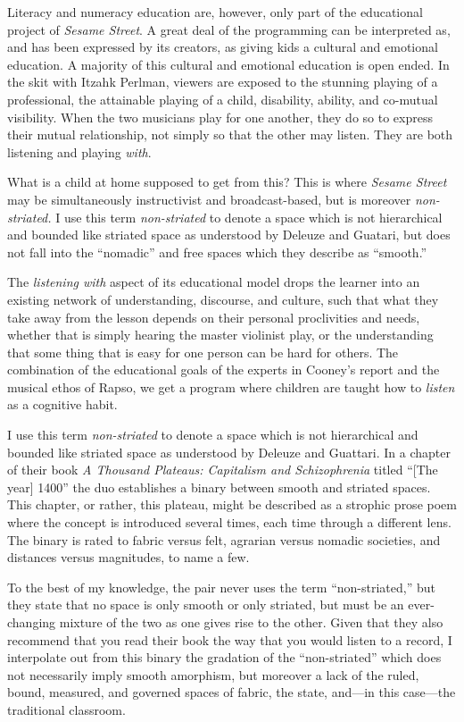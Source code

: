 \documentclass[12pt,letterpaper]{article}
\begin{document}
	Literacy and numeracy education are, however, only part of the 
	educational project of \textit{Sesame Street}. A great deal of the 
	programming can be interpreted as, and has been expressed by its 
	creators, as giving kids a cultural and emotional 
	education.\autocite[297]{Ostrofsky2012}
	A majority of this cultural and emotional education is open ended. 
	In the skit with Itzahk Perlman, viewers are exposed to the stunning 
	playing of a professional, the attainable playing of a child, 
	disability, ability, and co-mutual visibility. When the two musicians 
	play for one another, they do so to express their mutual relationship, 
	not simply so that the other may listen. They are both listening and 
	playing \textit{with}. 

	What is a child at home supposed to get from this? This is where 
	\textit{Sesame Street} may be simultaneously instructivist and 
	broadcast-based, but 
	is moreover \textit{non-striated.} I use this term 
	\textit{non-striated} to denote a space which is not
	hierarchical and bounded like striated space as understood by Deleuze 
	and Guatari, but does not fall into the ``nomadic'' and free spaces 
	which they describe as ``smooth.'' 

	The \textit{listening with} aspect of its 
	educational model drops the learner into an existing network of 
	understanding, discourse, and culture, such that what they take away
	from the lesson depends on their personal proclivities and needs, 
	whether that is simply hearing the master violinist play, or the 
	understanding that some thing that is easy for one person can be hard 
	for others. The combination of the educational goals of the experts
	in Cooney's report and the musical ethos of Rapso, we get a program 
	where children are taught how to \textit{listen} as a cognitive habit. 

	I use this term \textit{non-striated} to denote a space which is not
	hierarchical and bounded like striated space as understood by Deleuze 
	and Guattari. In a chapter of their book \textit{A Thousand Plateaus: 
	Capitalism and Schizophrenia} titled ``[The year] 1400'' the duo 
	establishes a binary between smooth and striated spaces. This chapter, 
	or rather, this
	plateau, might be described as a strophic prose poem where the concept 
	is introduced several times, each time through a different lens. The 
	binary 
	is rated to fabric versus felt,	agrarian versus nomadic societies, and 
	distances versus magnitudes, to name a few.   

	To the best of my knowledge, the pair never uses the term 
	``non-striated,'' but they state that no space is only smooth or 
	only striated, but must be an ever-changing mixture of the two as one 
	gives rise to the other.\autocite[474]{Deleuze} Given that they also 
	recommend that you read their book the way that you would listen to a 
	record,\autocite[ix]{Deleuze} I interpolate out from this binary the 
	gradation of the ``non-striated'' which does not necessarily 
	imply smooth amorphism, but moreover a lack of the ruled, bound, 
	measured, and governed spaces of fabric, the state, and---in this 
	case---the traditional classroom.       
\end{document}

